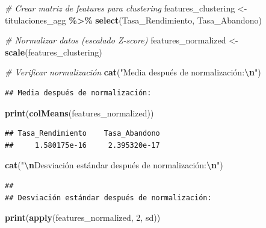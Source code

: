 \documentclass[
]{article}
\newenvironment{Shaded}{\begin{snugshade}}{\end{snugshade}}
\newcommand{\CommentTok}[1]{\textcolor[rgb]{0.56,0.35,0.01}{\textit{#1}}}
\newcommand{\DecValTok}[1]{\textcolor[rgb]{0.00,0.00,0.81}{#1}}
\newcommand{\FunctionTok}[1]{\textcolor[rgb]{0.13,0.29,0.53}{\textbf{#1}}}
\newcommand{\NormalTok}[1]{#1}
\newcommand{\OtherTok}[1]{\textcolor[rgb]{0.56,0.35,0.01}{#1}}
\newcommand{\SpecialCharTok}[1]{\textcolor[rgb]{0.81,0.36,0.00}{\textbf{#1}}}
\newcommand{\StringTok}[1]{\textcolor[rgb]{0.31,0.60,0.02}{#1}}
\begin{document}
\begin{Shaded}
\begin{Highlighting}[]
\CommentTok{\# Crear matriz de features para clustering}
\NormalTok{features\_clustering }\OtherTok{\textless{}{-}}\NormalTok{ titulaciones\_agg }\SpecialCharTok{\%\textgreater{}\%}
  \FunctionTok{select}\NormalTok{(Tasa\_Rendimiento, Tasa\_Abandono)}

\CommentTok{\# Normalizar datos (escalado Z{-}score)}
\NormalTok{features\_normalized }\OtherTok{\textless{}{-}} \FunctionTok{scale}\NormalTok{(features\_clustering)}

\CommentTok{\# Verificar normalización}
\FunctionTok{cat}\NormalTok{(}\StringTok{"Media después de normalización:}\SpecialCharTok{\textbackslash{}n}\StringTok{"}\NormalTok{)}
\end{Highlighting}
\end{Shaded}

\begin{verbatim}
## Media después de normalización:
\end{verbatim}

\begin{Shaded}
\begin{Highlighting}[]
\FunctionTok{print}\NormalTok{(}\FunctionTok{colMeans}\NormalTok{(features\_normalized))}
\end{Highlighting}
\end{Shaded}

\begin{verbatim}
## Tasa_Rendimiento    Tasa_Abandono 
##     1.580175e-16     2.395320e-17
\end{verbatim}

\begin{Shaded}
\begin{Highlighting}[]
\FunctionTok{cat}\NormalTok{(}\StringTok{"}\SpecialCharTok{\textbackslash{}n}\StringTok{Desviación estándar después de normalización:}\SpecialCharTok{\textbackslash{}n}\StringTok{"}\NormalTok{)}
\end{Highlighting}
\end{Shaded}

\begin{verbatim}
## 
## Desviación estándar después de normalización:
\end{verbatim}

\begin{Shaded}
\begin{Highlighting}[]
\FunctionTok{print}\NormalTok{(}\FunctionTok{apply}\NormalTok{(features\_normalized, }\DecValTok{2}\NormalTok{, sd))}
\end{Highlighting}
\end{Shaded}
\end{document}
